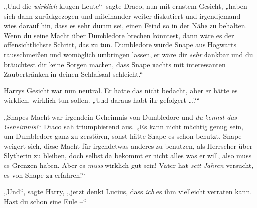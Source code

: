 „Und die \emph{wirklich} klugen Leute“, sagte Draco, nun mit ernstem Gesicht, „haben sich dann zurückgezogen und miteinander weiter diskutiert und irgendjemand wies darauf hin, dass es sehr dumm sei, einen Feind so in der Nähe zu behalten. Wenn du seine Macht über Dumbledore brechen könntest, dann wäre es der offensichtlichste Schritt, das zu tun. Dumbledore würde Snape aus Hogwarts rausschmeißen und womöglich umbringen lassen, er wäre dir \emph{sehr} dankbar und du bräuchtest dir keine Sorgen machen, dass Snape nachts mit interessanten Zaubertränken in deinen Schlafsaal schleicht.“

Harrys Gesicht war nun neutral. Er hatte das nicht bedacht, aber er hätte es wirklich, wirklich tun sollen. „Und daraus habt ihr gefolgert …?“

„Snapes Macht war irgendein Geheimnis von Dumbledore und \emph{du kennst das Geheimnis!}“ Draco sah triumphierend aus. „Es kann nicht mächtig genug sein, um Dumbledore ganz zu zerstören, sonst hätte Snape es schon benutzt. Snape weigert sich, diese Macht für irgendetwas anderes zu benutzen, als Herrscher über Slytherin zu bleiben, doch selbst da bekommt er nicht alles was er will, also muss es Grenzen haben. Aber es \emph{muss} wirklich gut sein! Vater hat \emph{seit Jahren} versucht, es von Snape zu erfahren!“

„Und“, sagte Harry, „jetzt denkt Lucius, dass \emph{ich} es ihm vielleicht verraten kann. Hast du schon eine Eule –“

